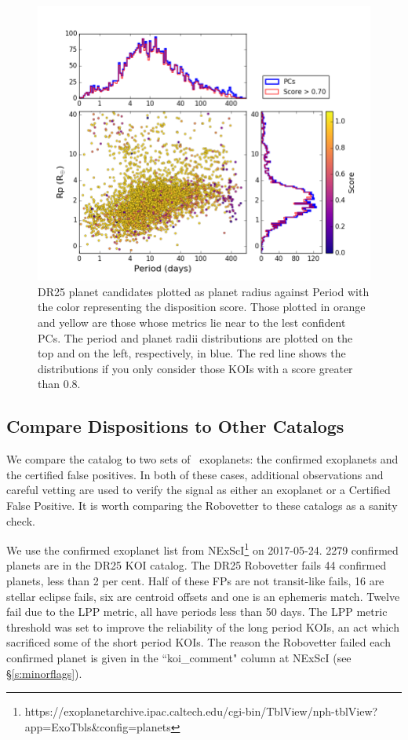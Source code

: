 \begin{figure}[ht]
    \centering
    \includegraphics[width=1.1\linewidth]{fig-radiusPeriodScore-hist.png}
    \caption{DR25 planet candidates plotted as planet radius against Period with the color representing the disposition score. Those plotted in orange and yellow are those whose metrics lie near to the lest confident PCs.  The period and planet radii distributions are plotted on the top and on the left, respectively, in blue. The red line shows the distributions if you only consider those KOIs with a score greater than 0.8. }
    \label{f:catalogPlot}
\end{figure}

\subsection{Compare Dispositions to Other Catalogs}
We compare the catalog to two sets of \Kepler\ exoplanets: the confirmed exoplanets and the certified false positives.  In both of these cases, additional observations and careful vetting are used to verify the signal as either an exoplanet or a Certified False Positive. It is worth comparing the Robovetter to these catalogs as a sanity check.  

We use the confirmed exoplanet list from NExScI\footnote{https://exoplanetarchive.ipac.caltech.edu/cgi-bin/TblView/nph-tblView?app=ExoTbls\&config=planets} on 2017-05-24.  2279 confirmed planets are in the DR25 KOI catalog.  The DR25 Robovetter fails 44 confirmed planets, less than 2 per cent. Half of these FPs are not transit-like fails, 16 are stellar eclipse fails, six are centroid offsets and one is an ephemeris match. Twelve fail due to the LPP metric, all have periods less than 50 days.  The LPP metric threshold was set to improve the reliability of the long period KOIs, an act which sacrificed some of the short period KOIs.  The reason the Robovetter failed each confirmed planet is given in the ``koi\_comment" column at NExScI (see \S\ref{s:minorflags}). 

